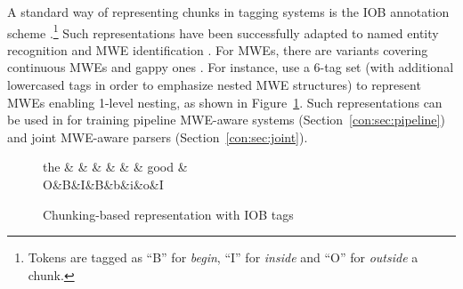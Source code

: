 \documentclass[output=paper]{langsci/langscibook}
\begin{document}
A standard way of representing chunks in tagging systems is the IOB annotation scheme \citep{ramshaw1995}.\footnote{Tokens are tagged as ``B'' for \textit{begin}, ``I'' for \textit{inside} and ``O'' for \textit{outside} a chunk.} Such representations have been successfully adapted to named entity recognition \citep{tjong2002} and MWE identification \citep{vincze11,constant12acl}. For MWEs, there are variants covering continuous MWEs \citep{blunsom-baldwin:2006:emnlp} and gappy ones \citep{schneider14mwe}.
For instance, \citet{schneider14mwe} use a 6-tag set (with additional lowercased tags in order to emphasize nested MWE structures) to represent MWEs enabling 1-level nesting, as shown in Figure~\ref{con:fig:iob}. Such representations can be used in  for training pipeline MWE-aware systems (Section~\ref{con:sec:pipeline}) and joint MWE-aware parsers (Section~\ref{con:sec:joint}).


\begin{figure}[t]
\small
\begin{center}
\begin{dependency}[edge unit distance=2ex]
\begin{deptext}[column sep=.7cm]
the \& \color{red}{prime} \& \color{red}{minister} \& \color{blue}{made} \& \color{orange}{a} \& \color{orange}{few} \& good \& \color{blue}{decisions} \\
O\&\color{red}B\&\color{red}I\&\color{blue}B\&\color{orange}b\&\color{orange}i\&o\&\color{blue}I\\
\end{deptext}
\end{dependency}
\vspace{-0.3cm}
\caption{Chunking-based representation with IOB tags \citep{schneider14mwe}}
\label{con:fig:iob}
\end{center}
\end{figure}

\end{document}

